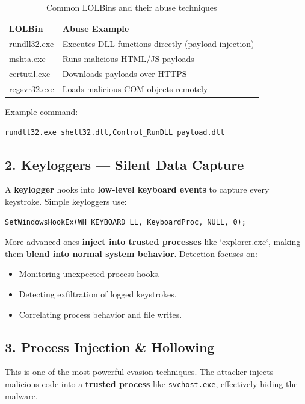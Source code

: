 \begin{table}[H]
    \centering
    \begin{tabular}{|l|l|}
        \hline
        \textbf{LOLBin} & \textbf{Abuse Example} \\
        \hline
        rundll32.exe & Executes DLL functions directly (payload injection) \\
        mshta.exe & Runs malicious HTML/JS payloads \\
        certutil.exe & Downloads payloads over HTTPS \\
        regsvr32.exe & Loads malicious COM objects remotely \\
        \hline
    \end{tabular}
    \caption{Common LOLBins and their abuse techniques}
\end{table}

Example command:
\begin{verbatim}
rundll32.exe shell32.dll,Control_RunDLL payload.dll
\end{verbatim}

\subsection{2. Keyloggers — Silent Data Capture}

A \textbf{keylogger} hooks into \textbf{low-level keyboard events} to capture every keystroke. Simple keyloggers use:
\begin{verbatim}
SetWindowsHookEx(WH_KEYBOARD_LL, KeyboardProc, NULL, 0);
\end{verbatim}

More advanced ones \textbf{inject into trusted processes} like `explorer.exe`, making them \textbf{blend into normal system behavior}. Detection focuses on:

\begin{itemize}
    \item Monitoring unexpected process hooks.
    \item Detecting exfiltration of logged keystrokes.
    \item Correlating process behavior and file writes.
\end{itemize}

\subsection{3. Process Injection \& Hollowing}

This is one of the most powerful evasion techniques. The attacker injects malicious code into a \textbf{trusted process} like \texttt{svchost.exe}, effectively hiding the malware.

